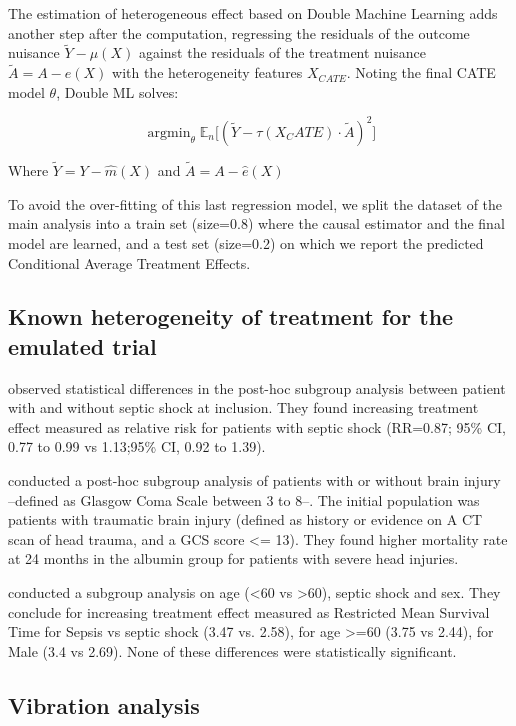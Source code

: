 \documentclass[french,12pt,twoside,a4paper]{book}
\DeclareMathOperator*{\argmin}{argmin} \def\mycitecolor{green!50!black}
\begin{document}
\begin{appendices}
  The estimation of heterogeneous effect based on Double Machine Learning adds
  another step after the computation, regressing the residuals of the outcome
  nuisance $\tilde{Y} - \mu(X)$ against the residuals of the treatment nuisance
  $\tilde{A} = A - e(X)$ with the heterogeneity features $X_{CATE}$. Noting the
  final CATE model $\theta$, Double ML solves:

  $$\argmin_{\theta} \mathbb E_n \big[(\tilde{Y} - \tau (X_CATE) \cdot \tilde{A})^2\big ]$$

  Where $\tilde{Y} = Y - \hat m(X)$ and $\tilde{A} = A - \hat e(X)$

  To avoid the over-fitting of this last regression model, we split the dataset of
  the main analysis into a train set (size=0.8) where the causal estimator and the final
  model are learned, and a test set (size=0.2) on which we report the predicted Conditional Average
  Treatment Effects.

  \subsection{Known heterogeneity of treatment for the emulated trial}\label{apd:cate_literature}

  \cite{caironi2014albumin} observed statistical differences in the post-hoc
  subgroup analysis between patient with and without septic shock at inclusion.
  They found increasing treatment effect measured as relative risk for patients
  with septic shock (RR=0.87; 95\% CI, 0.77 to 0.99 vs 1.13;95\% CI, 0.92 to 1.39).

  \cite{safe2007saline} conducted a post-hoc subgroup analysis of patients with or
  without brain injury --defined as Glasgow Coma Scale between 3 to 8--. The
  initial population was patients with traumatic brain injury (defined as history
  or evidence on A CT scan of head trauma, and a GCS score <= 13). They found
  higher mortality rate at 24 months in the albumin group for patients with severe
  head injuries.

  \cite{zhou2021early} conducted a subgroup analysis on age (<60 vs >60), septic
  shock and sex. They conclude for increasing treatment effect measured as
  Restricted Mean Survival Time for Sepsis vs septic shock (3.47 vs. 2.58), for
  age >=60 (3.75 vs 2.44), for Male (3.4 vs 2.69). None of these differences were
  statistically significant.

  \subsection{Vibration analysis}\label{apd:cate_results}


\end{appendices}
\end{document}
